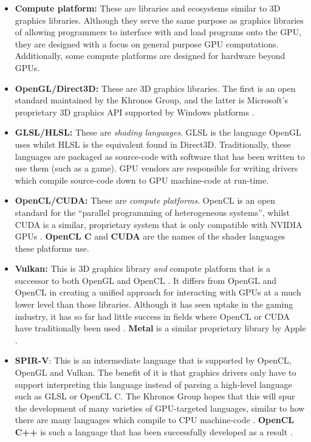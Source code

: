 \documentclass[a4paper,12pt,twoside,openright]{report}
\begin{document}
\begin{itemize}
    \item \textbf{Compute platform:} These are libraries and ecosystems similar
    to 3D graphics libraries. Although they serve the same purpose as graphics
    libraries of allowing programmers to interface with and load programs onto
    the GPU, they are designed with a focus on general purpose GPU
    computations. Additionally, some compute platforms are designed for
    hardware beyond GPUs.

    \item \textbf{OpenGL/Direct3D:} These are 3D graphics libraries. The first
    is an open standard maintained by the Khronos Group, and the
    latter is Microsoft's proprietary 3D graphics API supported by Windows
    platforms \cite{OpenGL} \cite{Direct3D}.

    \item \textbf{GLSL/HLSL:} These are \textit{shading languages}. GLSL is the
    language OpenGL uses whilst HLSL is the equivalent found in Direct3D.
    Traditionally, these languages are packaged as source-code with software
    that has been written to use them (such as a game). GPU vendors are
    responsible for writing drivers which compile source-code down to GPU
    machine-code at run-time.

    \item \textbf{OpenCL/CUDA:} These are \textit{compute platforms}. OpenCL is
    an open standard for the ``parallel programming of heterogeneous systems'',
    whilst CUDA is a similar, proprietary system that is only compatible with
    NVIDIA GPUs \cite{OpenCL} \cite{CUDA}. \textbf{OpenCL C} and \textbf{CUDA}
    are the names of the shader languages these platforms use.

    \item \textbf{Vulkan:} This is 3D graphics library \textit{and} compute
    platform that is a successor to both OpenGL and OpenCL \cite{Vulkan}. It
    differs from OpenGL and OpenCL in creating a unified approach for
    interacting with GPUs at a much lower level than those libraries. Although
    it has seen uptake in the gaming industry, it has so far had little success
    in fields where OpenCL or CUDA have traditionally been used \cite{TODO}
    \cite{TODO}. \textbf{Metal} is a similar proprietary library by Apple
    \cite{Metal}.

    \item \textbf{SPIR-V}: This is an intermediate language that is supported
    by OpenCL, OpenGL and Vulkan. The benefit of it is that graphics drivers
    only have to support interpreting this language instead of parsing a
    high-level language such as GLSL or OpenCL C. The Khronos Group hopes that
    this will spur the development of many varieties of GPU-targeted languages,
    similar to how there are many languages which compile to CPU machine-code
    \cite{SPIRV}. \textbf{OpenCL C++} is such a language that has been
    successfully developed as a result \cite{OpenCLCPPWhitePaper}.


\end{itemize}
\end{document}
